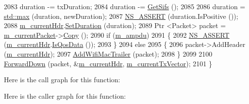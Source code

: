 \begin{DoxyCode}
2083   duration -= txDuration;
2084   duration -= \hyperlink{classns3_1_1MacLow_a9107421b7ed9f291d60b8344b4918e56}{GetSifs} ();
2085 
2086   duration = \hyperlink{80211b_8c_affe776513b24d84b39af8ab0930fef7f}{std::max} (duration, newDuration);
2087   \hyperlink{assert_8h_a6dccdb0de9b252f60088ce281c49d052}{NS\_ASSERT} (duration.IsPositive ());
2088   \hyperlink{classns3_1_1MacLow_aec9902bc8026338baf261d2de8fcd83b}{m\_currentHdr}.\hyperlink{classns3_1_1WifiMacHeader_a8c0936e7d1a0d1e43ccfcd21f43830fb}{SetDuration} (duration);
2089   Ptr <Packet> packet = \hyperlink{classns3_1_1MacLow_aa4f81bb523ceed1bbf5a84851b25e29c}{m\_currentPacket}->\hyperlink{classns3_1_1Packet_a5d5c70802a5f77fc5f0001e0cfc1898b}{Copy} ();
2090   \textcolor{keywordflow}{if} (\hyperlink{classns3_1_1MacLow_a59c50cdd4a959f8dfc629d6df2e3cc00}{m\_ampdu})
2091     \{
2092       \hyperlink{assert_8h_a6dccdb0de9b252f60088ce281c49d052}{NS\_ASSERT} (\hyperlink{classns3_1_1MacLow_aec9902bc8026338baf261d2de8fcd83b}{m\_currentHdr}.\hyperlink{classns3_1_1WifiMacHeader_a922e8c2b26023f2627ea19d9c4f4738b}{IsQosData} ());
2093     \}
2094   \textcolor{keywordflow}{else}
2095     \{
2096       packet->AddHeader (\hyperlink{classns3_1_1MacLow_aec9902bc8026338baf261d2de8fcd83b}{m\_currentHdr});
2097       \hyperlink{classns3_1_1MacLow_acaafc67755f16f347e9161310d71e3ef}{AddWifiMacTrailer} (packet);
2098     \}
2099 
2100   \hyperlink{classns3_1_1MacLow_a4eefbfa3d57539dadf0224cc7fcf952d}{ForwardDown} (packet, &\hyperlink{classns3_1_1MacLow_aec9902bc8026338baf261d2de8fcd83b}{m\_currentHdr}, \hyperlink{classns3_1_1MacLow_af87bd81ded4d362f9f1dc89dbbee65a3}{m\_currentTxVector});
2101 \}
\end{DoxyCode}


Here is the call graph for this function\+:




Here is the caller graph for this function\+:


